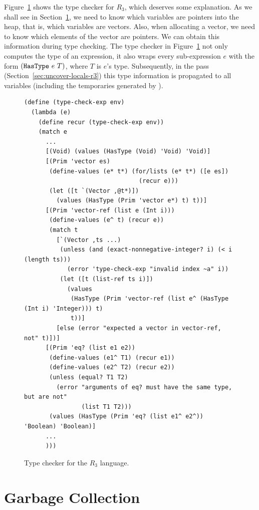 \documentclass[11pt]{book}
\begin{document}
Figure~\ref{fig:typecheck-R3} shows the type checker for $R_3$, which
deserves some explanation. As we shall see in Section~\ref{sec:GC}, we
need to know which variables are pointers into the heap, that is,
which variables are vectors. Also, when allocating a vector, we need
to know which elements of the vector are pointers. We can obtain this
information during type checking. The type checker in
Figure~\ref{fig:typecheck-R3} not only computes the type of an
expression, it also wraps every sub-expression $e$ with the form
$(\texttt{HasType}~e~T)$, where $T$ is $e$'s type.
Subsequently, in the  pass
(Section~\ref{sec:uncover-locals-r3}) this type information is
propagated to all variables (including the temporaries generated by
).

\begin{figure}[tbp]
\begin{lstlisting}
(define (type-check-exp env)
  (lambda (e)
    (define recur (type-check-exp env))
    (match e
      ...
      [(Void) (values (HasType (Void) 'Void) 'Void)]
      [(Prim 'vector es)
       (define-values (e* t*) (for/lists (e* t*) ([e es])
                                (recur e)))
       (let ([t `(Vector ,@t*)])
         (values (HasType (Prim 'vector e*) t) t))]
      [(Prim 'vector-ref (list e (Int i)))
       (define-values (e^ t) (recur e))
       (match t
         [`(Vector ,ts ...)
          (unless (and (exact-nonnegative-integer? i) (< i (length ts)))
            (error 'type-check-exp "invalid index ~a" i))
          (let ([t (list-ref ts i)])
            (values
             (HasType (Prim 'vector-ref (list e^ (HasType (Int i) 'Integer))) t)
             t))]
         [else (error "expected a vector in vector-ref, not" t)])]
      [(Prim 'eq? (list e1 e2))
       (define-values (e1^ T1) (recur e1))
       (define-values (e2^ T2) (recur e2))
       (unless (equal? T1 T2)
         (error "arguments of eq? must have the same type, but are not"
                (list T1 T2)))
       (values (HasType (Prim 'eq? (list e1^ e2^)) 'Boolean) 'Boolean)]
      ...
      )))
\end{lstlisting}
\caption{Type checker for the $R_3$ language.}
\label{fig:typecheck-R3}
\end{figure}


\section{Garbage Collection}
\label{sec:GC}
\end{document}
